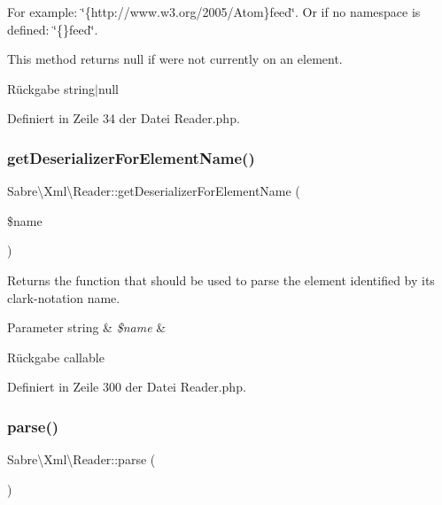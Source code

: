 For example\+: \char`\"{}\{http\+://www.\+w3.\+org/2005/\+Atom\}feed\char`\"{}. Or if no namespace is defined\+: \char`\"{}\{\}feed\char`\"{}.

This method returns null if we\textquotesingle{}re not currently on an element.

\begin{DoxyReturn}{Rückgabe}
string$\vert$null 
\end{DoxyReturn}


Definiert in Zeile 34 der Datei Reader.\+php.

\mbox{\label{class_sabre_1_1_xml_1_1_reader_ae2db9561397736daa69f003dc364356f}} 
\subsubsection{\texorpdfstring{get\+Deserializer\+For\+Element\+Name()}{getDeserializerForElementName()}}
{\footnotesize\ttfamily Sabre\textbackslash{}\+Xml\textbackslash{}\+Reader\+::get\+Deserializer\+For\+Element\+Name (\begin{DoxyParamCaption}\item[{}]{\$name }\end{DoxyParamCaption})}

Returns the function that should be used to parse the element identified by it\textquotesingle{}s clark-\/notation name.


\begin{DoxyParams}[1]{Parameter}
string & {\em \$name} & \\
\hline
\end{DoxyParams}
\begin{DoxyReturn}{Rückgabe}
callable 
\end{DoxyReturn}


Definiert in Zeile 300 der Datei Reader.\+php.

\mbox{\label{class_sabre_1_1_xml_1_1_reader_af918d81cafeab81a7e1eab0c32c25da7}} 
\subsubsection{\texorpdfstring{parse()}{parse()}}
{\footnotesize\ttfamily Sabre\textbackslash{}\+Xml\textbackslash{}\+Reader\+::parse (\begin{DoxyParamCaption}{ }\end{DoxyParamCaption})}

